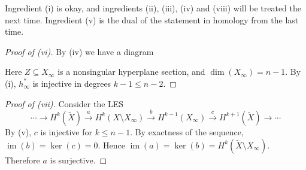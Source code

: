 \documentclass[A4paper, british, reqno]{amsart}
\theoremstyle{darkgreentheorem}
\theoremstyle{darkbluedefinition}
\theoremstyle{darkredexample}
\theoremstyle{remark}
\DeclareMathOperator{\im}{im}
\newcommand{\1}{\mathbbm{1}}
\newcommand{\op}{\oplus}
\newcommand{\sub}{\subseteq}
\begin{document}
Ingredient (i) is okay, and ingredients (ii), (iii), (iv) and (viii) will be treated the next time.
Ingredient (v) is the dual of the statement in homology from the last time.

\begin{proof}[Proof of (vi)]
    By (iv) we have a diagram
    \begin{center}
    \end{center}
    Here $Z\sub X_{\infty}$ is a nonsingular hyperplane section, and $\dim(X_{\infty})=n-1$.
    By (i), $h_{\infty}^{*}$ is injective in degrees $k-1\leqslant n-2$.
\end{proof}

\begin{proof}[Proof of (vii)]
    Consider the LES
    \[ \cdots \to H^{k}(\tilde{X})\xrightarrow{a} H^{k}(X\setminus X_{\infty})\xrightarrow{b} H^{k-1}(X_{\infty})\xrightarrow{c}H^{k+1}(\tilde{X})\to \cdots \]
    By (v), $c$ is injective for $k\leqslant n-1$.
    By exactness of the sequence, $\im(b)=\ker(c)=0$.
    Hence $\im(a)=\ker(b)=H^{k}(\tilde{X}\setminus X_{\infty})$.
    Therefore $a$ is surjective.
\end{proof}
\end{document}
